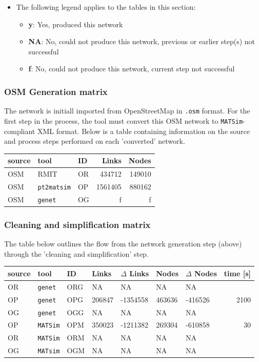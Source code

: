 \documentclass[11pt]{article}
\begin{document}
\begin{itemize}
\item The following legend applies to the tables in this section:
\begin{itemize}
\item \textbf{y}: Yes, produced this network
\item \textbf{NA}: No, could not produce this network, previous or earlier step(s) not successful
\item \textbf{f}: No, could not produce this network, current step not successful
\end{itemize}
\end{itemize}
\subsubsection{OSM Generation  matrix}
\label{sec:orgdfa7dd4}
The network is initiall imported from OpenStreetMap in \texttt{.osm} format. For the first step in the process, the tool must convert this OSM network to \texttt{MATSim}-compliant XML format. Below is a table containing information on the source and process steps performed on each 'converted' network.

\begin{center}
\begin{tabular}{lllrr}
source & tool & ID & Links & Nodes\\
\hline
OSM & RMIT & OR & 434712 & 149010\\
OSM & \texttt{pt2matsim} & OP & 1561405 & 880162\\
OSM & \texttt{genet} & OG & f & f\\
\end{tabular}
\end{center}
\subsubsection{Cleaning and simplification matrix}
\label{sec:org463e242}
The table below outlines the flow from the network generation step (above) through the 'cleaning and simplification' step.

\begin{center}
\begin{tabular}{lllllllr}
source & tool & ID & Links & \(\Delta\) Links & Nodes & \(\Delta\) Nodes & time [s]\\
\hline
OR & \texttt{genet} & ORG & NA & NA & NA & NA & \\
OP & \texttt{genet} & OPG & 206847 & -1354558 & 463636 & -416526 & 2100\\
OG & \texttt{genet} & OGG & NA & NA & NA & NA & \\
OP & \texttt{MATSim} & OPM & 350023 & -1211382 & 269304 & -610858 & 30\\
OR & \texttt{MATSim} & ORM & NA & NA & NA & NA & \\
OG & \texttt{MATsim} & OGM & NA & NA & NA & NA & \\
\end{tabular}
\end{center}
\end{document}
